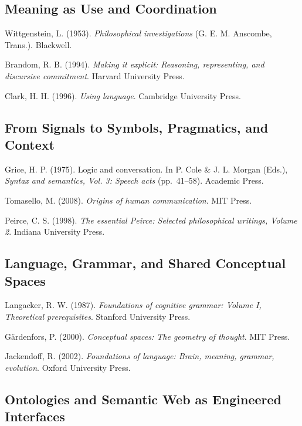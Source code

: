 \documentclass[
  openright]{book}
\begin{document}
\subsection{Meaning as Use and
Coordination}\label{meaning-as-use-and-coordination-1}

Wittgenstein, L. (1953). \emph{Philosophical investigations} (G. E. M.
Anscombe, Trans.). Blackwell.

Brandom, R. B. (1994). \emph{Making it explicit: Reasoning,
representing, and discursive commitment}. Harvard University Press.

Clark, H. H. (1996). \emph{Using language}. Cambridge University Press.

\subsection{From Signals to Symbols, Pragmatics, and
Context}\label{from-signals-to-symbols-pragmatics-and-context-1}

Grice, H. P. (1975). Logic and conversation. In P. Cole \& J. L. Morgan
(Eds.), \emph{Syntax and semantics, Vol. 3: Speech acts} (pp.~41--58).
Academic Press.

Tomasello, M. (2008). \emph{Origins of human communication}. MIT Press.

Peirce, C. S. (1998). \emph{The essential Peirce: Selected philosophical
writings, Volume 2}. Indiana University Press.

\subsection{Language, Grammar, and Shared Conceptual
Spaces}\label{language-grammar-and-shared-conceptual-spaces-1}

Langacker, R. W. (1987). \emph{Foundations of cognitive grammar: Volume
I, Theoretical prerequisites}. Stanford University Press.

Gärdenfors, P. (2000). \emph{Conceptual spaces: The geometry of
thought}. MIT Press.

Jackendoff, R. (2002). \emph{Foundations of language: Brain, meaning,
grammar, evolution}. Oxford University Press.

\subsection{Ontologies and Semantic Web as Engineered
Interfaces}\label{ontologies-and-semantic-web-as-engineered-interfaces-1}
\end{document}
